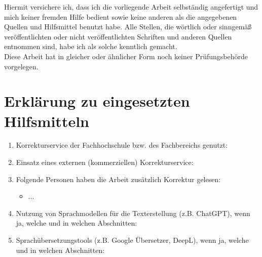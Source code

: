 Hiermit versichere ich, dass ich die vorliegende Arbeit selbständig angefertigt und mich keiner fremden Hilfe bedient sowie keine anderen als die angegebenen Quellen und Hilfsmittel benutzt habe. Alle Stellen, die wörtlich oder sinngemäß veröffentlichten oder nicht veröffentlichten Schriften und anderen Quellen entnommen sind, habe ich als solche kenntlich gemacht.\\

Diese Arbeit hat in gleicher oder ähnlicher Form noch keiner Prüfungsbehörde vorgelegen.\\
\section*{Erklärung zu eingesetzten Hilfsmitteln}
\begin{enumerate}
	\item Korrekturservice der Fachhochschule bzw. des Fachbereichs genutzt:
	\item Einsatz eines externen (kommerziellen) Korrekturservice:
	\item Folgende Personen haben die Arbeit zusätzlich Korrektur gelesen:
	\begin{itemize}
		\item ...
	\end{itemize}
	\item Nutzung von Sprachmodellen für die Texterstellung (z.B. ChatGPT), wenn ja, welche und in welchen Abschnitten:
	\item Sprachübersetzungstools (z.B. Google Übersetzer, DeepL), wenn ja, welche und in welchen Abschnitten:

\end{enumerate}
